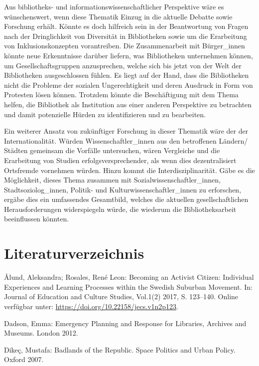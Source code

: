 \documentclass[a4paper,
fontsize=11pt,
oneside,
numbers=noperiodatend,
parskip=half-,
bibliography=totoc,
final
]{scrartcl}
\begin{document}
Aus bibliotheks- und informationswissenschaftlicher Perspektive wäre es
wünschenswert, wenn diese Thematik Einzug in die aktuelle Debatte sowie
Forschung erhält. Könnte es doch hilfreich sein in der Beantwortung von
Fragen nach der Dringlichkeit von Diversität in Bibliotheken sowie um
die Erarbeitung von Inklusionskonzepten vorantreiben. Die Zusammenarbeit
mit Bürger\_innen könnte neue Erkenntnisse darüber liefern, was
Bibliotheken unternehmen können, um Gesellschaftsgruppen anzusprechen,
welche sich bis jetzt von der Welt der Bibliotheken ausgeschlossen
fühlen. Es liegt auf der Hand, dass die Bibliotheken nicht die Probleme
der sozialen Ungerechtigkeit und deren Ausdruck in Form von Protesten
lösen können. Trotzdem könnte die Beschäftigung mit dem Thema helfen,
die Bibliothek als Institution aus einer anderen Perspektive zu
betrachten und damit potenzielle Hürden zu identifizieren und zu
bearbeiten.

Ein weiterer Ansatz von zukünftiger Forschung in dieser Thematik wäre
der der Internationalität. Würden Wissenschaftler\_innen aus den
betroffenen Ländern/ Städten gemeinsam die Vorfälle untersuchen, wären
Vergleiche und die Erarbeitung von Studien erfolgsversprechender, als
wenn dies dezentralisiert Ortsfremde vornehmen würden. Hinzu kommt die
Interdisziplinarität. Gäbe es die Möglichkeit, dieses Thema zusammen mit
Sozialwissenschaftler\_innen, Stadtsoziolog\_innen, Politik- und
Kulturwissenschaftler\_innen zu erforschen, ergäbe dies ein umfassendes
Gesamtbild, welches die aktuellen gesellschaftlichen Herausforderungen
widerspiegeln würde, die wiederum die Bibliotheksarbeit beeinflussen
könnten.

\hypertarget{literaturverzeichnis}{%
\section{Literaturverzeichnis}\label{literaturverzeichnis}}

Ålund, Aleksandra; Rosales, René Leon: Becoming an Activist Citizen:
Individual Experiences and Learning Processes within the Swedish
Suburban Movement. In: Journal of Education and Culture Studies,
Vol.1(2) 2017, S. 123--140. Online verfügbar unter:
\url{https://doi.org/10.22158/jecs.v1n2p123}.

Dadson, Emma: Emergency Planning and Response for Libraries, Archives
and Museums. London 2012.

Dikeç, Mustafa: Badlands of the Republic. Space Politics and Urban
Policy. Oxford 2007.
\end{document}
